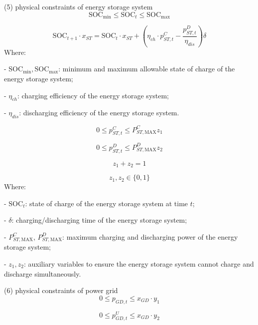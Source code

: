 \documentclass{article}
\begin{document}
 (5) physical constraints of energy storage system
\begin{equation}
\text{SOC}_{\min} \leq \text{SOC}_t \leq \text{SOC}_{\max} 
\end{equation}

\begin{equation}
\text{SOC}_{t+1} \cdot x_{ST} = \text{SOC}_t \cdot x_{ST} + \left(\eta_{ch} \cdot p_{ST,t}^C - \frac{p_{ST,t}^D}{\eta_{dis}}\right) \delta 
\end{equation}
Where:

\noindent - \(\text{SOC}_{\min}, \text{SOC}_{\max}\): minimum and maximum allowable state of charge of the energy storage system;

\noindent - \(\eta_{ch}\): charging efficiency of the energy storage system;

\noindent - \(\eta_{dis}\): discharging efficiency of the energy storage system.

\begin{equation}
0 \leq p_{ST,t}^C \leq P_{ST,\text{MAX}}^C z_1 
\end{equation}

\begin{equation}
0 \leq p_{ST,t}^D \leq P_{ST,\text{MAX}}^D z_2 
\end{equation}

\begin{equation}
z_1 + z_2 = 1
\end{equation}

\begin{equation}
z_1, z_2 \in \{0,1\} 
\end{equation}
Where:

\noindent - \(\text{SOC}_t\): state of charge of the energy storage system at time \(t\);

\noindent - \(\delta\): charging/discharging time of the energy storage system;

\noindent - \(P_{ST,\text{MAX}}^C\), \(P_{ST,\text{MAX}}^D\): maximum charging and discharging power of the energy storage system;

\noindent - \(z_1, z_2\): auxiliary variables to ensure the energy storage system cannot charge and discharge simultaneously.

(6) physical constraints of power grid
\begin{equation}
0 \leq p_{GD,t} \leq x_{GD} \cdot y_1 
\end{equation}

\begin{equation}
0 \leq p_{GD,t}^{U} \leq x_{GD} \cdot y_2 
\end{equation}
\end{document}
